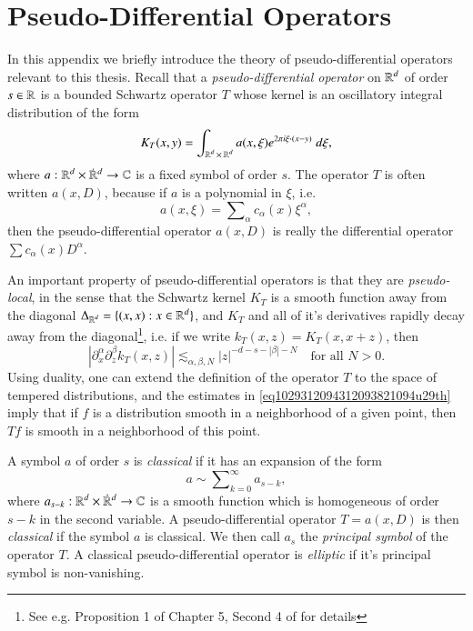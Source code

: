 \renewcommand{\thechapter}{C}
\chapter{Pseudo-Differential Operators} \label{appendixpsueiodjaweiodj}

In this appendix we briefly introduce the theory of pseudo-differential operators relevant to this thesis. Recall that a \emph{pseudo-differential operator} on $\operatorname{\mathbb{R}}^d$ of order $s \in \operatorname{\mathbb{R}}$ is a bounded Schwartz operator $T$ whose kernel is an oscillatory integral distribution of the form
%
\begin{equation}
    K_T(x,y) = \int_{\operatorname{\mathbb{R}}^d \times \operatorname{\mathbb{R}}^d} a(x,\xi) e^{2 \pi i \xi \cdot (x - y)}\; d\xi,
\end{equation}
%
where $a: {\RR^d} \times {\dot{\RR}{\vphantom{\RR}}^d} \to \CC$ is a fixed symbol of order $s$. The operator $T$ is often written $a(x,D)$, because if $a$ is a polynomial in $\xi$, i.e.
%
\begin{equation}
    a(x,\xi) = \sum\nolimits_\alpha c_\alpha(x) \xi^\alpha,
\end{equation}
%
then the pseudo-differential operator $a(x,D)$ is really the differential operator $\sum c_\alpha(x) D^\alpha$.

An important property of pseudo-differential operators is that they are \emph{pseudo-local}, in the sense that the Schwartz kernel $K_T$ is a smooth function away from the diagonal $\Delta_{\operatorname{\mathbb{R}}^d} = \{ (x,x): x \in \operatorname{\mathbb{R}}^d \}$, and $K_T$ and all of it's derivatives rapidly decay away from the diagonal\footnote{See e.g. Proposition 1 of Chapter 5, Second 4 of \cite{BigStein} for details}, i.e. if we write $k_T(x,z) = K_T(x,x+z)$, then
%
\begin{equation} \label{eq1029312094312093821094u29th}
    | \partial_x^\alpha \partial_z^\beta k_T(x,z)| \lesssim_{\alpha,\beta,N} |z|^{-d-s-|\beta| - N} \quad\text{for all $N > 0$}.
\end{equation}
%
Using duality, one can extend the definition of the operator $T$ to the space of tempered distributions, and the estimates in \eqref{eq1029312094312093821094u29th} imply that if $f$ is a distribution smooth in a neighborhood of a given point, then $Tf$ is smooth in a neighborhood of this point.
%
%

A symbol $a$ of order $s$ is \emph{classical} if it has an expansion of the form
%
\begin{equation}
    a \sim \sum\nolimits_{k = 0}^\infty a_{s - k},
\end{equation}
%
where $a_{s-k}: {\RR^d} \times  {\dot{\RR}{\vphantom{\RR}}^d} \to \CC$ is a smooth function which is homogeneous of order $s - k$ in the second variable. A pseudo-differential operator $T = a(x,D)$ is then \emph{classical} if the symbol $a$ is classical. We then call $a_s$ the \emph{principal symbol} of the operator $T$. A classical pseudo-differential operator is \emph{elliptic} if it's principal symbol is non-vanishing.

